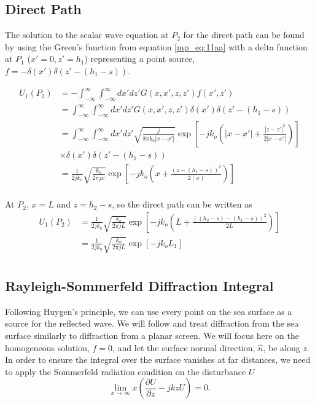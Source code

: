 \subsection{Direct Path}
The solution to the scalar wave equation at $P_2$ for the direct path can be found by using the Green's function from equation \ref{mp_eq:11aa} with a delta function at $P_1$ ($x' = 0, z' = h_1$) representing a point source, $f = -\delta(x') \delta(z'- (h_1-s)) $.

\begin{equation}
\begin{aligned}
U_1(P_2) &= -\int_{-\infty}^{\infty} \int_{-\infty}^{\infty}dx' dz' G\left(x,x',z,z' \right) f(x',z') \\
&= \int_{-\infty}^{\infty} \int_{-\infty}^{\infty}dx' dz' G\left(x,x',z,z' \right)\delta(x') \delta(z'- (h_1-s)) \\
&= \int_{-\infty}^{\infty} \int_{-\infty}^{\infty}dx' dz' \sqrt{\frac{j}{8\pi k_o|x-x'|}}\exp\left[-jk_o\left(|x -x'| + \frac{|z-z'|^2}{2|x-x'|}\right) \right] \\
&\times \delta(x') \delta(z'- (h_1-s)) \\
&= \frac{1}{2jk_o}\sqrt{\frac{k_o}{2\pi jx}}\exp\left[-jk_o\left(x + \frac{(z-(h_1-s))^2}{2(x)}\right) \right]\\
\end{aligned}
\label{mp_eq:11ab}
\end{equation}
\renewcommand{\baselinestretch}{2} \small\normalsize

At $P_2$, $x = L$ and $z = h_2-s$, so the direct path can be written as
\begin{equation}
\begin{aligned}
U_1(P_2) &= \frac{1}{2jk_o}\sqrt{\frac{k_o}{2\pi jL}}\exp\left[-jk_o\left(L + \frac{((h_2-s)-(h_1-s))^2}{2L}\right) \right]\\
&=\frac{1}{2jk_o} \sqrt{\frac{k_o}{2\pi jL}}\exp\left[-jk_oL_1 \right]\\
\end{aligned}
\label{mp_eq:11ac}
\end{equation}
\renewcommand{\baselinestretch}{2} \small\normalsize

\subsection{Rayleigh-Sommerfeld Diffraction Integral}
Following Huygen's principle, we can use every point on the sea surface as a source for the reflected wave. We will follow \cite{goodman_fourier} and treat diffraction from the sea surface similarly to diffraction from a planar screen. We will focus here on the homogeneous solution, $f=0$, and let the surface normal direction, $\hat{n}$, be along $z$. In order to ensure the integral over the surface vanishes at far distances, we need to apply the Sommerfeld radiation condition on the disturbance $U$
\begin{equation}
 \lim_{x\to\infty} x\left(\frac{\partial U}{\partial z} -jkzU \right) = 0.
\label{mp_eq:11aaaa}
\end{equation}
\renewcommand{\baselinestretch}{2} \small\normalsize

